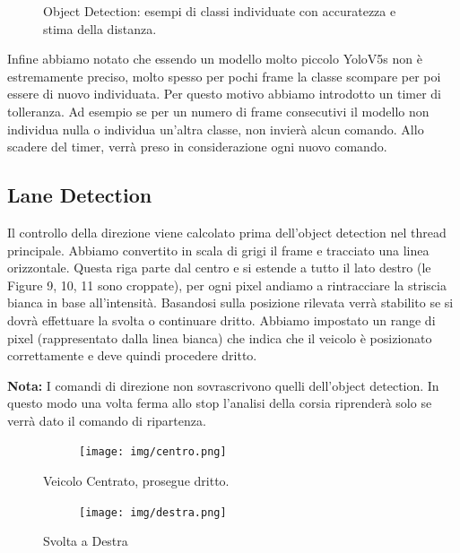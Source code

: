 \documentclass{article}
\begin{document}
\begin{figure}[h!]
    \caption{Object Detection: esempi di classi individuate con accuratezza e stima della distanza.}
    \label{fig:object_detection}
\end{figure}



    Infine abbiamo notato che essendo un modello molto piccolo YoloV5s non è estremamente preciso, molto spesso per pochi frame la classe scompare per poi essere di nuovo individuata. Per questo motivo abbiamo introdotto un timer di tolleranza. Ad esempio se per un numero di frame consecutivi il modello non individua nulla o individua un'altra classe, non invierà alcun comando. Allo scadere del timer, verrà preso in considerazione ogni nuovo comando.
    

  
\newpage

\subsection{Lane Detection}
Il controllo della direzione viene calcolato prima dell'object detection nel thread principale. Abbiamo convertito in scala di grigi il frame e tracciato una linea orizzontale. Questa riga parte dal centro e si estende a tutto il lato destro (le Figure 9, 10, 11 sono croppate), per ogni pixel andiamo a rintracciare la striscia bianca in base all'intensità. Basandosi sulla posizione rilevata verrà stabilito se si dovrà effettuare la svolta o continuare dritto. Abbiamo impostato un range di pixel (rappresentato dalla linea bianca) che indica che il veicolo è posizionato correttamente e deve quindi procedere dritto. 

\textbf{Nota:} I comandi di direzione non sovrascrivono quelli dell'object detection. In questo modo una volta ferma allo stop l'analisi della corsia riprenderà solo se verrà dato il comando di ripartenza. 

\begin{figure}[h!]
    \centering
    \begin{subfigure}[b]{0.8\linewidth}
        \centering
        \texttt{[image: img/centro.png]}
        \label{fig:centro}
    \end{subfigure}
    \label{fig:posizione-centro}
    \caption{Veicolo Centrato, prosegue dritto.}
\end{figure}

\begin{figure}[h!]
    \centering
    \begin{subfigure}[b]{0.8\linewidth}
        \centering
        \texttt{[image: img/destra.png]}
        \label{fig:destra}
    \end{subfigure}
        \caption{Svolta a Destra}
    \label{fig:posizione-destra}
\end{figure}
\end{document}
